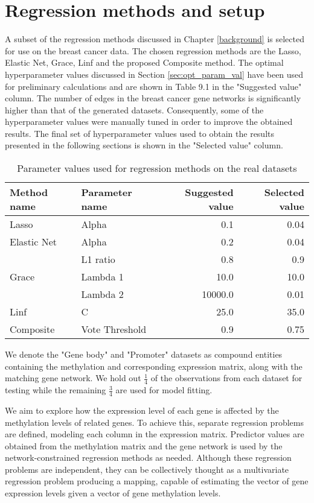 \section{Regression methods and setup}
A subset of the regression methods discussed in Chapter \ref{background} is selected for use on the breast cancer data. The chosen regression methods are the Lasso, Elastic Net, Grace, Linf and the proposed Composite method.
The optimal hyperparameter values discussed in Section \ref{sec:opt_param_val} have been used for preliminary calculations and are shown in Table 
9.1 %
in the "Suggested value" column. The number of edges in the breast cancer gene networks is significantly higher than that of the generated datasets. Consequently, some of the hyperparameter values were manually tuned in order to improve the obtained results. The final set of hyperparameter values used to obtain the results presented in the following sections is shown in the "Selected value" column.

{\def\arraystretch{1.5}\tabcolsep=10pt
	\begin{table}[H]
		\label{tab:numbering_hack}
		\caption{Parameter values used for regression methods on the real datasets}
		\centering
		\begin{tabular}{l l r r}
			\hline\hline 
			Method name & Parameter name & Suggested value & Selected value\\
			\hline\hline
			Lasso	&	Alpha	&	0.1	&	0.04\\
			\hline
			Elastic Net	&	Alpha	&	0.2	&	0.04\\
						&	L1 ratio&	0.8	&	0.9\\
			\hline
			Grace	&	Lambda 1	&	10.0	&	10.0\\
					&	Lambda 2	&	10000.0	&	0.01\\
			\hline
			Linf	&	C	&	25.0	&	35.0\\
			\hline
			Composite	&	Vote Threshold	&	0.9	&	0.75\\
			\hline
		\end{tabular}
	\end{table}
}

We denote the "Gene body" and "Promoter" datasets as compound entities containing the methylation and corresponding expression matrix, along with the matching gene network. We hold out $\frac{1}{4}$ of the observations from each dataset for testing while the remaining $\frac{3}{4}$ are used for model fitting.

We aim to explore how the expression level of each gene is affected by the methylation levels of related genes. To achieve this, separate regression problems are defined, modeling each column in the expression matrix. Predictor values are obtained from the methylation matrix and the gene network is used by the network-constrained regression methods as needed. Although these regression problems are independent, they can be collectively thought as a multivariate regression problem producing a mapping, capable of estimating the vector of gene expression levels given a vector of gene methylation levels.


